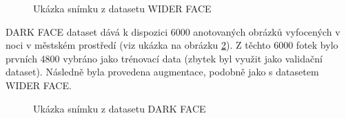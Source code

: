 \begin{figure}[H]
  \begin{center}
  \label{obrazek:widerfaceexample}
  \caption{Ukázka snímku z datasetu WIDER FACE}
  \end{center}
\end{figure}

DARK FACE dataset dává k dispozici 6000 anotovaných obrázků vyfocených v noci v městském prostředí (viz ukázka na obrázku \ref{obrazek:darkfaceexample}). Z těchto 6000 fotek bylo prvních 4800 vybráno jako trénovací data (zbytek byl využit jako validační dataset). Následně byla provedena augmentace, podobně jako s datasetem WIDER FACE.

\begin{figure}[H]
  \begin{center}
  \label{obrazek:darkfaceexample}
  \caption{Ukázka snímku z datasetu DARK FACE}
  \end{center}
\end{figure}

